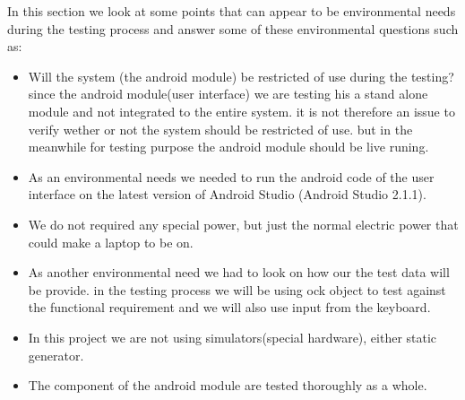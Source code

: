 In this section we look at some points that can appear to be environmental needs during the testing process and answer some of these environmental questions such as:

\begin{itemize}

     \item Will the system (the android module) be restricted of use during the testing? since the android module(user interface) we are testing his a stand alone module and not integrated to the entire system. it is not therefore an issue to verify wether or not the system should be restricted of use. but in the meanwhile for testing purpose the android module should be live runing.

     \item As an environmental needs we needed to run the android code of the user interface on  the latest version of Android Studio (Android Studio 2.1.1). 

      \item We do not required any special power, but just the normal electric power that could make a laptop to be on.

      \item  As another environmental need we had to look on how our the test data will be provide. in the testing process we will be using ock object to test against the functional requirement and we will also use input  from the keyboard. 
 
       \item In this project we are not using simulators(special hardware), either static generator.

       \item The component of the android module are tested thoroughly as a whole.
\end{itemize}
  

 